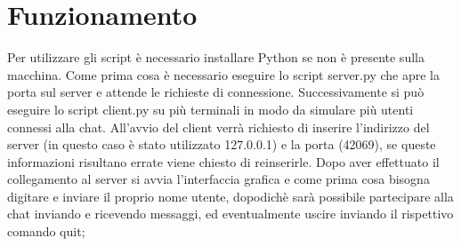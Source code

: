 \documentclass[a4paper,12pt]{report}
\begin{document}
\chapter{Funzionamento}
Per utilizzare gli script è necessario installare Python se non è presente sulla macchina. Come prima cosa è necessario eseguire lo script server.py che apre la porta sul server e attende le richieste di connessione.
Successivamente si può eseguire lo script client.py su più terminali in modo da simulare più utenti connessi alla chat. All'avvio del client verrà richiesto di inserire l'indirizzo del server (in questo caso è stato utilizzato 127.0.0.1) e la porta (42069),
se queste informazioni risultano errate viene chiesto di reinserirle. Dopo aver effettuato il collegamento al server si avvia l'interfaccia grafica e come prima cosa bisogna digitare e inviare il proprio nome utente,
dopodichè sarà possibile partecipare alla chat inviando e ricevendo messaggi, ed eventualmente uscire inviando il rispettivo comando {quit};
\end{document}
